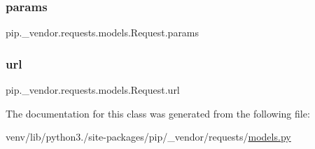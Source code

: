 \subsubsection{\texorpdfstring{params}{params}}
{\footnotesize\ttfamily pip.\+\_\+vendor.\+requests.\+models.\+Request.\+params}

\mbox{\label{classpip_1_1__vendor_1_1requests_1_1models_1_1Request_a2f09fa6b6d5dc1b66f18f35c87a6a9ac}} 
\subsubsection{\texorpdfstring{url}{url}}
{\footnotesize\ttfamily pip.\+\_\+vendor.\+requests.\+models.\+Request.\+url}



The documentation for this class was generated from the following file\+:\begin{DoxyCompactItemize}
\item 
venv/lib/python3./site-\/packages/pip/\+\_\+vendor/requests/\hyperlink{__vendor_2requests_2models_8py}{models.\+py}\end{DoxyCompactItemize}

